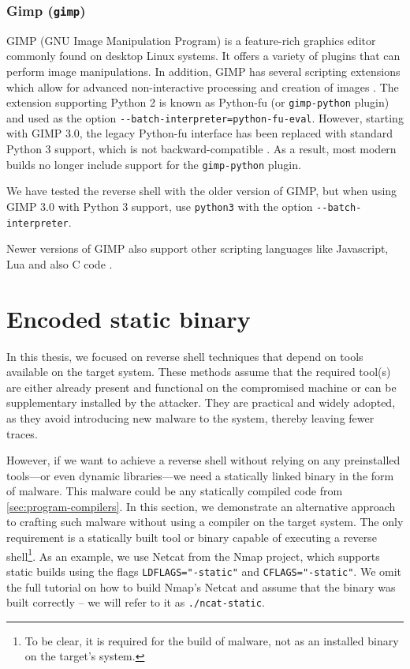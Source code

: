 \subsubsection{Gimp (\texttt{gimp})}


GIMP (GNU Image Manipulation Program) is a feature-rich graphics editor commonly found on desktop Linux systems. It offers a variety of plugins that can perform image manipulations. In addition, GIMP has several scripting extensions which allow for advanced non-interactive processing and creation of images \cite{gimp-man}. The extension supporting Python 2 is known as Python-fu (or \texttt{gimp-python} plugin) and used as the option \texttt{-{}-batch-interpreter=python-fu-eval}. However, starting with GIMP 3.0, the legacy Python-fu interface has been replaced with standard Python 3 support, which is not backward-compatible \cite{gimp-3}. As a result, most modern builds no longer include support for the \texttt{gimp-python} plugin.

We have tested the reverse shell with the older version of GIMP, but when using GIMP 3.0 with Python 3 support, use \texttt{python3} with the option \texttt{-{}-batch-interpreter}.


Newer versions of GIMP also support other scripting languages like Javascript, Lua and also C code \cite{gimp-3}.


\section{Encoded static binary}

In this thesis, we focused on reverse shell techniques that depend on tools available on the target system. These methods assume that the required tool(s) are either already present and functional on the compromised machine or can be supplementary installed by the attacker. They are practical and widely adopted, as they avoid introducing new malware to the system, thereby leaving fewer traces.

However, if we want to achieve a reverse shell without relying on any preinstalled tools—or even dynamic libraries—we need a statically linked binary in the form of malware. This malware could be any statically compiled code from \cref{sec:program-compilers}. In this section, we demonstrate an alternative approach to crafting such malware without using a compiler on the target system. The only requirement is a statically built tool or binary capable of executing a reverse shell\footnote{To be clear, it is required for the build of malware, not as an installed binary on the target's system.}. As an example, we use Netcat from the Nmap project, which supports static builds using the flags \texttt{LDFLAGS="-static"} and \texttt{CFLAGS="-static"}. We omit the full tutorial on how to build Nmap's Netcat and assume that the binary was built correctly -- we will refer to it as \texttt{./ncat-static}.

